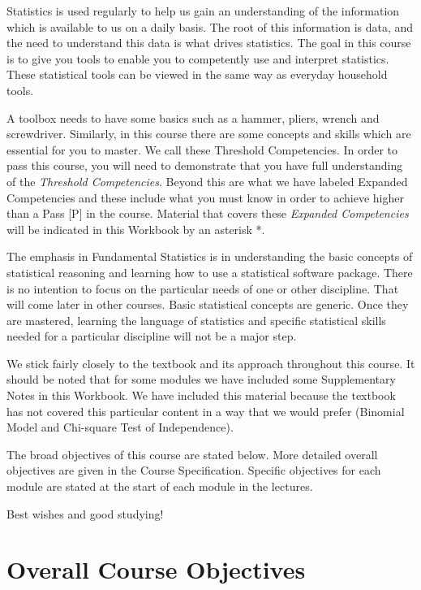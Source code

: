 \documentclass[
]{book}
\begin{document}
Statistics is used regularly to help us gain an understanding of the information
which is available to us on a daily basis. The root of this information is data, and
the need to understand this data is what drives statistics. The goal in this course
is to give you tools to enable you to competently use and interpret statistics. These
statistical tools can be viewed in the same way as everyday household tools.

A toolbox needs to have some basics such as a hammer, pliers, wrench and screwdriver.
Similarly, in this course there are some concepts and skills which are essential
for you to master. We call these Threshold Competencies. In order to pass this course,
you will need to demonstrate that you have full understanding of the \emph{Threshold
Competencies}. Beyond this are what we have labeled Expanded Competencies and
these include what you must know in order to achieve higher than a Pass {[}P{]} in the
course. Material that covers these \emph{Expanded Competencies} will be indicated in this
Workbook by an asterisk *.

The emphasis in Fundamental Statistics is in understanding the basic concepts of
statistical reasoning and learning how to use a statistical software package. There is no intention to focus on the particular needs of one or other discipline. That will
come later in other courses. Basic statistical concepts are generic. Once they are
mastered, learning the language of statistics and specific statistical skills needed for
a particular discipline will not be a major step.

We stick fairly closely to the textbook and its approach throughout this course. It
should be noted that for some modules we have included some Supplementary Notes
in this Workbook. We have included this material because the textbook has not
covered this particular content in a way that we would prefer (Binomial Model and
Chi-square Test of Independence).

The broad objectives of this course are stated below. More detailed overall objectives
are given in the Course Specification. Specific objectives for each module are stated
at the start of each module in the lectures.

Best wishes and good studying!

\section*{Overall Course Objectives}\label{overall-course-objectives}
\end{document}
